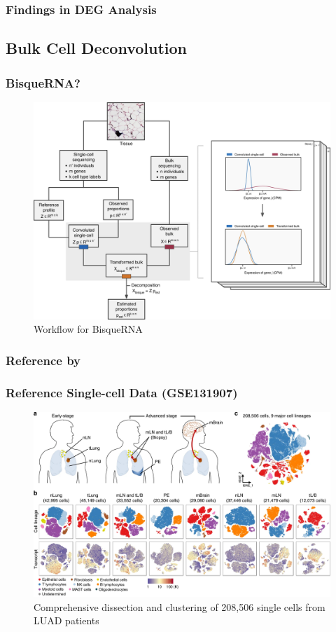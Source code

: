 \documentclass{beamer}
\begin{document}
    \begin{frame}
        \frametitle{Findings in DEG Analysis}
    \end{frame}

        \subsection{Bulk Cell Deconvolution}
    \begin{frame}
        \frametitle{BisqueRNA?}

        \begin{figure}
            \includegraphics[width=0.6 \linewidth]{figures/Workflow/Bisque.jpg}
            \caption{Workflow for BisqueRNA \protect\cite{Bisque1}}
        \end{figure}
    \end{frame}

    \subsubsection{Reference by \protect{}}
    \begin{frame}
         \frametitle{Reference Single-cell Data (GSE131907)}

        \begin{figure}
            \includegraphics[width=0.8 \linewidth]{figures/LungCancer/reference_1.jpg}
            \caption{Comprehensive dissection and clustering of 208,506 single cells from LUAD patients \protect\cite{singlecell1}}
        \end{figure}
    \end{frame}
\end{document}
